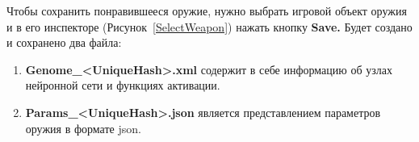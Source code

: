 Чтобы сохранить понравившееся оружие, нужно выбрать игровой объект оружия и в его инспекторе (Рисунок~\ref{SelectWeapon}) нажать кнопку {\small \textbf{Save.}} Будет создано и сохранено два файла:

\begin{enumerate}[label=\textbullet]
    \item {\small \textbf{Genome\_<UniqueHash>.xml}} содержит в себе информацию об узлах нейронной сети и функциях активации.
    \item {\small \textbf{Params\_<UniqueHash>.json}} является представлением параметров оружия в формате json.
\end{enumerate}

\pagebreak